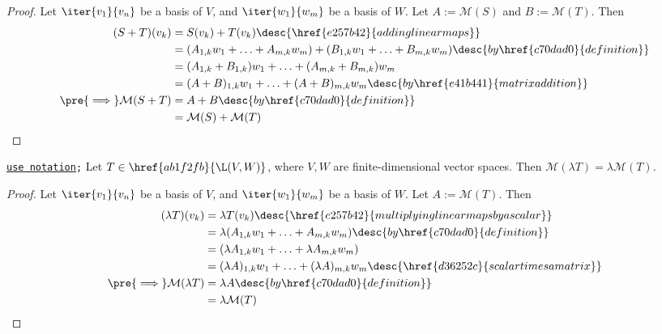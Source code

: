 \begin{proof}
  \def\M{\mathcal M}
  Let $\iter{v_1}{v_n}$ be a basis of $V$, and $\iter{w_1}{w_m}$ be a basis of
  $W$. Let $A:=\mathcal M(S)$ and $B:=\mathcal M(T)$. Then
  \begin{align*}
    (S+T)(v_k)            &=S(v_k)+T(v_k)\desc{\href{e257b42}{adding linear maps}}                                            \\
                          &=(A_{1,k}w_1+\ldots+A_{m,k}w_m)+(B_{1,k}w_1+\ldots+B_{m,k}w_m)\desc{by \href{c70dad0}{definition}} \\
                          &=(A_{1,k}+B_{1,k})w_1+\ldots+(A_{m,k}+B_{m,k})w_m                                                  \\
                          &=(A+B)_{1,k}w_1+\ldots+(A+B)_{m,k}w_m\desc{by \href{e41b441}{matrix addition}}                     \\
    \pre{\implies}\M(S+T) &=A+B\desc{by \href{c70dad0}{definition}}                                                           \\
                          &=\M(S)+\M(T)
  \end{align*}
\end{proof}

\label{f95a174}

\texttt{\href{d76dfe6}{use notation};} Let $T\in\href{ab1f2fb}{\L(V,W)}$, where
$V,W$ are finite-dimensional vector spaces. Then $\mathcal M(\lambda
T)=\lambda\mathcal M(T)$.

\begin{proof}
  \def\M{\mathcal M}
  Let $\iter{v_1}{v_n}$ be a basis of $V$, and $\iter{w_1}{w_m}$ be a basis of
  $W$. Let $A:=\mathcal M(T)$. Then
  \begin{align*}
    (\lambda T)(v_k)            &=\lambda T(v_k)\desc{\href{e257b42}{multiplying linear maps by a scalar}}                     \\
                                &=\lambda (A_{1,k}w_1+\ldots+A_{m,k}w_m)\desc{by \href{c70dad0}{definition}}                   \\
                                &=(\lambda A_{1,k}w_1+\ldots+\lambda A_{m,k}w_m)                                               \\
                                &=(\lambda A)_{1,k}w_1+\ldots+(\lambda A)_{m,k}w_m\desc{\href{d36252c}{scalar times a matrix}} \\
    \pre{\implies}\M(\lambda T) &=\lambda A\desc{by \href{c70dad0}{definition}}                                                \\
                                &=\lambda \M(T)
  \end{align*}
\end{proof}

